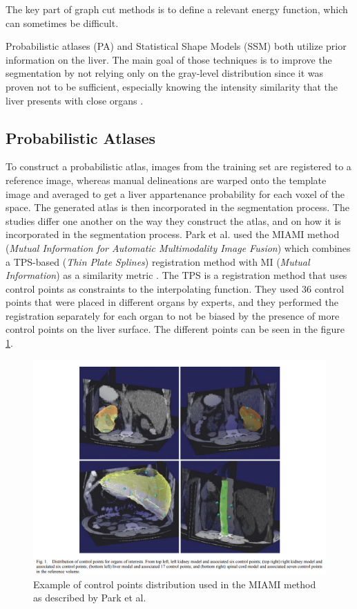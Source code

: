 \documentclass[]{article}
\begin{document}
	The key part of graph cut methods is to define a relevant energy
	function, which can sometimes be difficult.
	
	Probabilistic atlases (PA) and Statistical Shape Models (SSM) both
	utilize prior information on the liver. The main goal of those
	techniques is to improve the segmentation by not relying only on the
	gray-level distribution since it was proven not to be sufficient,
	especially knowing the intensity similarity that the liver presents with
	close organs \cite{Zhou2006, Park2003, Slagmolen2007, Rikxoort2007}.
	
	\subsection*{Probabilistic Atlases}
	
	To construct a probabilistic atlas, images from the training set are
	registered to a reference image, whereas manual delineations are warped
	onto the template image and averaged to get a liver appartenance
	probability for each voxel of the space. The generated atlas is then
	incorporated in the segmentation process. The studies differ one another
	on the way they construct the atlas, and on how it is incorporated in
	the segmentation process. 
	Park et al. used the MIAMI method (\emph{Mutual Information for Automatic
		Multimodality Image Fusion}) which combines a TPS-based (\emph{Thin
		Plate Splines}) registration method with MI (\emph{Mutual Information})
	as a similarity metric \cite{Park2003}. The TPS is a registration method that uses
	control points as constraints to the interpolating function. They used
	36 control points that were placed in different organs by experts, and
	they performed the registration separately for each organ to not be
	biased by the presence of more control points on the liver surface. The
	different points can be seen in the figure \ref{Park2003_Fig1}.
	
	\begin{figure}
		\centering
		\includegraphics[width=0.7\linewidth]{images/image34}
		\caption{Example of control points distribution used in the MIAMI method as described by Park et al. \cite{Park2003}}
		\label{Park2003_Fig1}
	\end{figure}
	
\end{document}
